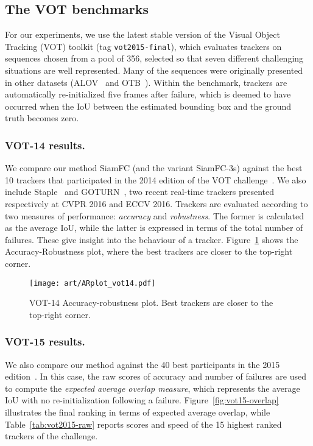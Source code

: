 \documentclass[runningheads]{llncs}
\begin{document}
\subsection{The VOT benchmarks}
For our experiments, we use the latest stable version of the Visual Object Tracking (VOT) toolkit (tag \texttt{vot2015-final}), which evaluates trackers on sequences chosen from a pool of 356, selected so that seven different challenging situations are well represented.
Many of the sequences were originally presented in other datasets (\eg ALOV~\cite{smeulders2014visual} and OTB~\cite{WuLimYang13}).
Within the benchmark, trackers are automatically re-initialized five frames after failure, which is deemed to have occurred when the IoU between the estimated bounding box and the ground truth becomes zero.

\subsubsection{VOT-14 results.}
We compare our method SiamFC (and the variant SiamFC-3s) against the best 10 trackers that participated in the 2014 edition of the VOT challenge~\cite{lirisvisual}. We  also include Staple~\cite{bertinetto2015staple} and GOTURN~\cite{held2016learning}, two recent real-time trackers presented respectively at CVPR 2016 and ECCV 2016.
Trackers are evaluated according to two measures of performance: \emph{accuracy} and \emph{robustness}.
The former is calculated as the average IoU, while the latter is expressed in terms of the total number of failures.
These give insight into the behaviour of a tracker.
Figure~\ref{fig:vot14-AR} shows the Accuracy-Robustness plot, where the best trackers are closer to the top-right corner.
\begin{figure}[t]
\centering
\texttt{[image: art/ARplot\_vot14.pdf]}
\caption{VOT-14 Accuracy-robustness plot. Best trackers are closer to the top-right corner.}
\label{fig:vot14-AR}
\end{figure}

\subsubsection{VOT-15 results.}
We also compare our method against the 40 best participants in the 2015 edition~\cite{kristan2015visual}.
In this case, the raw scores of accuracy and number of failures are used to compute the \emph{expected average overlap measure}, which represents the average IoU with no re-initialization following a failure.
Figure~\ref{fig:vot15-overlap} illustrates the final ranking in terms of expected average overlap, while Table~\ref{tab:vot2015-raw} reports scores and speed of the 15 highest ranked trackers of the challenge.
\end{document}
